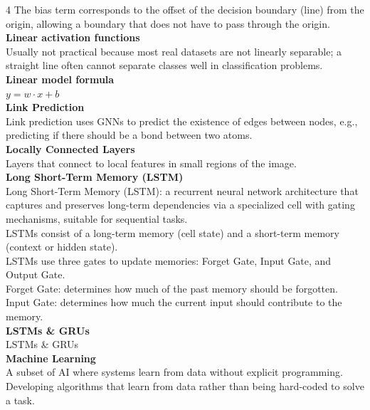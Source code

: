 \documentclass[8pt]{extarticle}
\begin{document}
\begin{multicols}{4}
The bias term corresponds to the offset of the decision boundary (line) from the origin, allowing a boundary that does not have to pass through the origin.\\
\vspace{2pt}\textbf{Linear activation functions}\\
Usually not practical because most real datasets are not linearly separable; a straight line often cannot separate classes well in classification problems.\\
\vspace{2pt}\textbf{Linear model formula}\\
$y = w\cdot x + b$\\
\vspace{2pt}\textbf{Link Prediction}\\
Link prediction uses GNNs to predict the existence of edges between nodes, e.g., predicting if there should be a bond between two atoms.\\
\vspace{2pt}\textbf{Locally Connected Layers}\\
Layers that connect to local features in small regions of the image.\\
\vspace{2pt}\textbf{Long Short-Term Memory (LSTM)}\\
Long Short-Term Memory (LSTM): a recurrent neural network architecture that captures and preserves long-term dependencies via a specialized cell with gating mechanisms, suitable for sequential tasks.\\
LSTMs consist of a long-term memory (cell state) and a short-term memory (context or hidden state).\\
LSTMs use three gates to update memories: Forget Gate, Input Gate, and Output Gate.\\
Forget Gate: determines how much of the past memory should be forgotten.\\
Input Gate: determines how much the current input should contribute to the memory.\\
\vspace{2pt}\textbf{LSTMs \& GRUs}\\
LSTMs \& GRUs\\
\vspace{2pt}\textbf{Machine Learning}\\
A subset of AI where systems learn from data without explicit programming.\\
Developing algorithms that learn from data rather than being hard-coded to solve a task.\\

\end{multicols}
\end{document}

